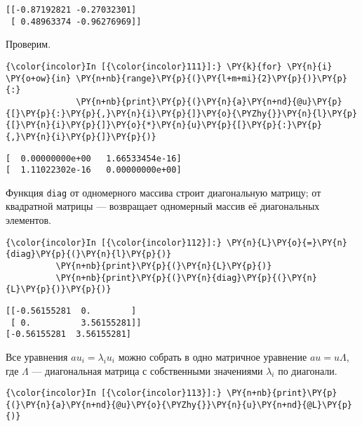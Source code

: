     \begin{Verbatim}[commandchars=\\\{\}]
[[-0.87192821 -0.27032301]
 [ 0.48963374 -0.96276969]]

    \end{Verbatim}

    Проверим.

    \begin{Verbatim}[commandchars=\\\{\}]
{\color{incolor}In [{\color{incolor}111}]:} \PY{k}{for} \PY{n}{i} \PY{o+ow}{in} \PY{n+nb}{range}\PY{p}{(}\PY{l+m+mi}{2}\PY{p}{)}\PY{p}{:}
              \PY{n+nb}{print}\PY{p}{(}\PY{n}{a}\PY{n+nd}{@u}\PY{p}{[}\PY{p}{:}\PY{p}{,}\PY{n}{i}\PY{p}{]}\PY{o}{\PYZhy{}}\PY{n}{l}\PY{p}{[}\PY{n}{i}\PY{p}{]}\PY{o}{*}\PY{n}{u}\PY{p}{[}\PY{p}{:}\PY{p}{,}\PY{n}{i}\PY{p}{]}\PY{p}{)}
\end{Verbatim}

    \begin{Verbatim}[commandchars=\\\{\}]
[  0.00000000e+00   1.66533454e-16]
[  1.11022302e-16   0.00000000e+00]

    \end{Verbatim}

    Функция \texttt{diag} от одномерного массива строит диагональную
матрицу; от квадратной матрицы --- возвращает одномерный массив её
диагональных элементов.

    \begin{Verbatim}[commandchars=\\\{\}]
{\color{incolor}In [{\color{incolor}112}]:} \PY{n}{L}\PY{o}{=}\PY{n}{diag}\PY{p}{(}\PY{n}{l}\PY{p}{)}
          \PY{n+nb}{print}\PY{p}{(}\PY{n}{L}\PY{p}{)}
          \PY{n+nb}{print}\PY{p}{(}\PY{n}{diag}\PY{p}{(}\PY{n}{L}\PY{p}{)}\PY{p}{)}
\end{Verbatim}

    \begin{Verbatim}[commandchars=\\\{\}]
[[-0.56155281  0.        ]
 [ 0.          3.56155281]]
[-0.56155281  3.56155281]

    \end{Verbatim}

    Все уравнения \(a u_i = \lambda_i u_i\) можно собрать в одно матричное
уравнение \(a u = u \Lambda\), где \(\Lambda\) --- диагональная матрица с
собственными значениями \(\lambda_i\) по диагонали.

    \begin{Verbatim}[commandchars=\\\{\}]
{\color{incolor}In [{\color{incolor}113}]:} \PY{n+nb}{print}\PY{p}{(}\PY{n}{a}\PY{n+nd}{@u}\PY{o}{\PYZhy{}}\PY{n}{u}\PY{n+nd}{@L}\PY{p}{)}
\end{Verbatim}

